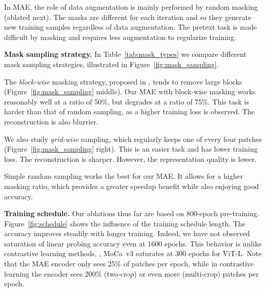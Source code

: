 \documentclass[10pt,twocolumn,letterpaper]{article}
\renewcommand{\paragraph}[1]{\vspace{1.25mm}\noindent\textbf{#1}}
\begin{document}
In MAE, the role of data augmentation is mainly performed by random masking (ablated next). The masks are different for each iteration and so they generate new training samples regardless of data augmentation. The pretext task is made difficult by masking and requires less augmentation to regularize training.

\paragraph{Mask sampling strategy.} In Table~\ref{tab:mask_types} we compare different mask sampling strategies, illustrated in Figure~\ref{fig:mask_sampling}.

The \textit{block-wise} masking strategy, proposed in \cite{Bao2021}, tends to remove large blocks (Figure~\ref{fig:mask_sampling} middle). Our MAE with block-wise masking works reasonably well at a ratio of 50\%, but degrades at a ratio of 75\%. This task is harder than that of random sampling, as a higher training loss is observed. The reconstruction is also blurrier.

We also study \textit{grid-wise} sampling, which regularly keeps one of every four patches (Figure~\ref{fig:mask_sampling} right). This is an easier task and has lower training loss. The reconstruction is sharper. However, the representation quality is lower.

Simple random sampling works the best for our MAE. It allows for a higher masking ratio, which provides a greater speedup benefit while also enjoying good accuracy.

\paragraph{Training schedule.} Our ablations thus far are based on 800-epoch pre-training. Figure~\ref{fig:schedule} shows the influence of the training schedule length. The accuracy improves steadily with longer training. Indeed, we have not observed saturation of linear probing accuracy even at 1600 epochs. This behavior is unlike contrastive learning methods, \eg, MoCo~v3 \cite{Chen2021a} saturates at 300 epochs for ViT-L. Note that the MAE encoder only sees 25\% of patches per epoch, while in contrastive learning the encoder sees 200\% (two-crop) or even more (multi-crop) patches per epoch.
\end{document}

